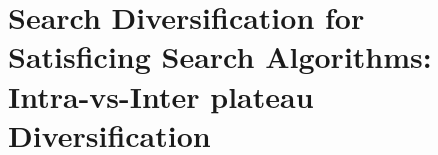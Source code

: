 
\chapter{Search Diversification for Satisficing Search Algorithms: Intra-vs-Inter plateau Diversification}

